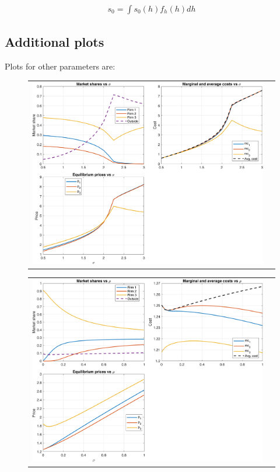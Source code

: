 \documentclass[12pt]{article}
\theoremstyle{plain}
\theoremstyle{plain}
\begin{document}
\begin{align}
    s_0 = \int s_0(h) f_h(h) dh
\end{align}

 

\subsection{Additional plots}\label{sec:appendix9}
Plots for other parameters are: 
\begin{figure}[H]
\caption{}
 \label{fig:sigma}
\centering{}%
\begin{tabular}{cc}
\includegraphics[scale=.7]{figures/simulations/sigma_panels_3firms.png} 
\end{tabular}
\end{figure}


 

 \begin{figure}[H]
\caption{}
 \label{fig:sigma}
\centering{}%
\begin{tabular}{cc}
\includegraphics[scale=.7]{figures/simulations/rho_panels_3firms.png} 
\end{tabular}
\end{figure}
 
\end{document}

